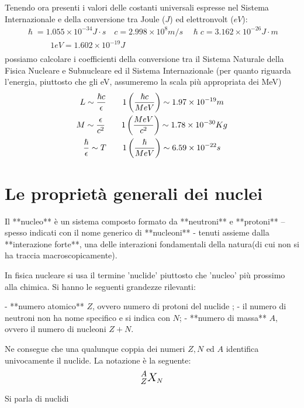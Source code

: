 Tenendo ora presenti i valori delle costanti universali espresse nel Sistema Internazionale e della conversione tra Joule ($J$) ed elettronvolt ($eV$): \begin{gather*}
    \hslash = 1.055 \times 10^{-34} J \cdot s \quad c = 2.998 \times 10^8 m/s \quad \hslash c = 3.162 \times 10^{-26} J \cdot m\\
    \qquad \quad 1 eV = 1.602 \times 10^{-19} J\\
\end{gather*}
possiamo calcolare i coefficienti della conversione tra il Sistema Naturale della Fisica Nucleare e Subnucleare ed il Sistema Internazionale (per quanto riguarda l'energia, piuttosto che gli eV, assumeremo la scala più appropriata dei MeV) \begin{gather*}
    L \sim \frac{\hslash c}{\epsilon} \qquad 1 \left(\frac{\hslash c}{MeV}\right) \sim 1.97      \times 10^{-19} m\\
    M \sim \frac{\epsilon}{c^2} \qquad 1 \left(\frac{MeV}{c^2}\right) \sim 1.78 \times 10^{-30} Kg\\
    \frac{\hslash}{\epsilon} \sim T \qquad 1 \left ( \frac{\hslash}{MeV} \right) \sim 6.59 \times 10^{-22} s\\
\end{gather*}

\section{Le proprietà generali dei nuclei}
\label{sec:proprieta-generali-dei-nuclei}

Il **nucleo** è un sistema composto formato da **neutroni** e **protoni** -- spesso indicati con il nome generico di **nucleoni** - tenuti assieme dalla **interazione forte**, una delle interazioni fondamentali della natura(di cui non si ha traccia macroscopicamente).

In fisica nucleare si usa il termine 'nuclide' piuttosto che 'nucleo' più prossimo alla chimica.
Si hanno le seguenti grandezze rilevanti:

-   **numero atomico** $Z$, ovvero numero di protoni del nuclide ;
-   il numero di neutroni non ha nome specifico e si indica con $N$;
-   **numero di massa** $A$, ovvero il numero di nucleoni $Z+N$.

Ne consegue che una qualunque coppia dei numeri $Z, N$ ed $A$ identifica univocamente il nuclide.
La notazione è la seguente:
\[
\mathlarger{\mathlarger{^A _{Z} X}}_N
\]

Si parla di nuclidi


